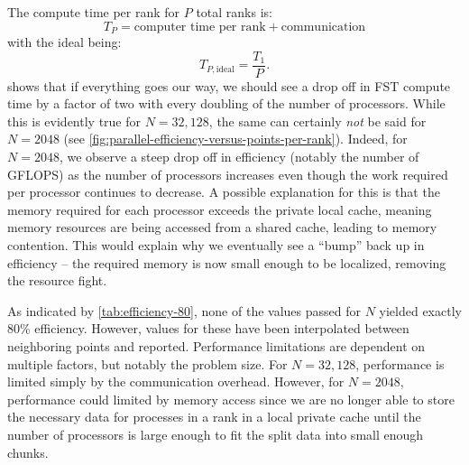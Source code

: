 \documentclass[11pt]{article}
\begin{document}
The compute time per rank for $P$ total ranks is:
\begin{equation}
  T_P=\text{computer time per rank}+\text{communication}
\end{equation}
with the ideal being:
\begin{equation}
  \label{eq:ideal_tp}
  T_{P,\text{ideal}}=\frac{T_1}{P}.
\end{equation}
 shows that if everything goes our way, we should see a drop off in FST compute time by a factor of two with every doubling of the number of processors.
While this is evidently true for $N=32,128$, the same can certainly \emph{not} be said for $N=2048$ (see \cref{fig:parallel-efficiency-versus-points-per-rank}).
Indeed, for $N=2048$, we observe a steep drop off in efficiency (notably the number of GFLOPS) as the number of processors increases even though the work required per processor continues to decrease.
A possible explanation for this is that the memory required for each processor exceeds the private local cache, meaning memory resources are being accessed from a shared cache, leading to memory contention.
This would explain why we eventually see a ``bump'' back up in efficiency -- the required memory is now small enough to be localized, removing the resource fight.

As indicated by \cref{tab:efficiency-80}, none of the values passed for $N$ yielded exactly 80\% efficiency.
However, values for these have been interpolated between neighboring points and reported.
Performance limitations are dependent on multiple factors, but notably the problem size.
For $N=32,128$, performance is limited simply by the communication overhead.
However, for $N=2048$, performance could limited by memory access since we are no longer able to store the necessary data for processes in a rank in a local private cache until the number of processors is large enough to fit the split data into small enough chunks.
\end{document}
